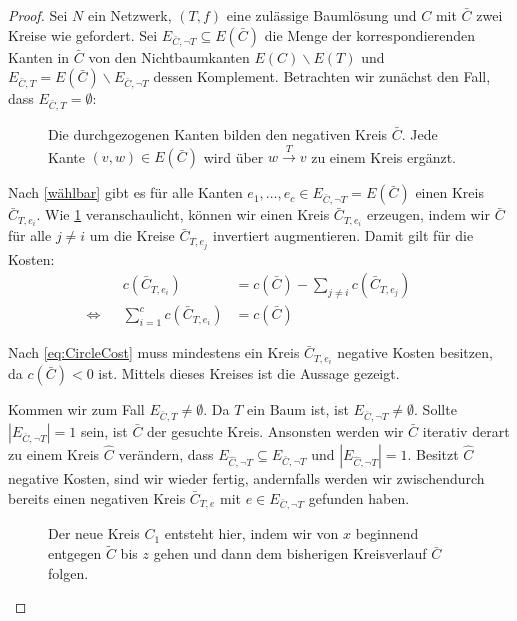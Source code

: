 \begin{proof}Sei $N$ ein Netzwerk, $(T,f)$ eine zulässige Baumlösung und $C$ mit $\bar{C}$ zwei Kreise wie gefordert. Sei $E_{\bar{C},\neg T}\subseteq E(\bar{C})$ die Menge der korrespondierenden Kanten in $\bar{C}$ von den Nichtbaumkanten $E(C)\backslash E(T)$ und $E_{\bar{C},T}=E(\bar{C})\backslash E_{\bar{C},\neg T}$ dessen Komplement. Betrachten wir zunächst den Fall, dass $E_{\bar{C},T}=\emptyset$:

\begin{figure}[!ht]\centering
	
	\caption{Die durchgezogenen Kanten bilden den negativen Kreis $\bar{C}$. Jede Kante $(v,w)\in E(\bar{C})$ wird über $w\xrightarrow{T}v$ zu einem Kreis ergänzt.}
	\label{fig:NTC}
\end{figure}

Nach \cref{wählbar} gibt es für alle Kanten $e_1,\ldots,e_c\in E_{\bar{C},\neg T}=E(\bar{C})$ einen Kreis $\bar{C}_{T,e_i}$. Wie \cref{fig:NTC} veranschaulicht, können wir einen Kreis $\bar{C}_{T,e_i}$ erzeugen, indem wir $\bar{C}$ für alle $j\neq i$ um die Kreise $\bar{C}_{T,e_j}$ invertiert augmentieren. Damit gilt für die Kosten:
\begin{align}
&&c(\bar{C}_{T,e_i})&=c(\bar{C})-\sum_{j\neq i} c(\bar{C}_{T,e_j})&&\nonumber\\
\Leftrightarrow&&\sum_{i=1}^{c} c(\bar{C}_{T,e_i})&=c(\bar{C})&&\label{eq:CircleCost}
\end{align}

Nach \cref{eq:CircleCost} muss mindestens ein Kreis $\bar{C}_{T,e_i}$ negative Kosten besitzen, da $c(\bar{C})<0$ ist. Mittels dieses Kreises ist die Aussage gezeigt.

Kommen wir zum Fall $E_{\bar{C},T}\neq\emptyset$. Da $T$ ein Baum ist, ist $E_{\bar{C},\neg T}\neq\emptyset$. Sollte $|E_{\bar{C},\neg T}|=1$ sein, ist $\bar{C}$ der gesuchte Kreis. Ansonsten werden wir $\bar{C}$ iterativ derart zu einem Kreis $\hat{C}$ verändern, dass $E_{\hat{C},\neg T}\subseteq E_{\bar{C},\neg T}$ und $|E_{\hat{C},\neg T}|=1$. Besitzt $\hat{C}$ negative Kosten, sind wir wieder fertig, andernfalls werden wir zwischendurch bereits einen negativen Kreis $\bar{C}_{T,e}$ mit $e\in E_{\bar{C},\neg T}$ gefunden haben.

\begin{figure}[!ht]\centering
	
	\caption{Der neue Kreis $C_1$ entsteht hier, indem wir von $x$ beginnend entgegen $\tilde{C}$ bis $z$ gehen und dann dem bisherigen Kreisverlauf $\bar{C}$ folgen.}
	\label{fig:TC}
\end{figure}


\end{proof}
